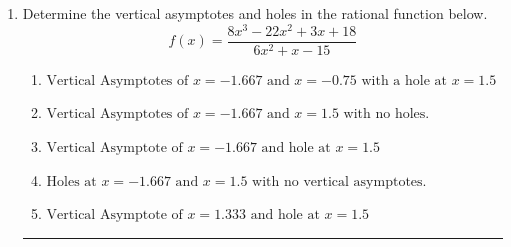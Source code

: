 \documentclass[14pt]{extbook}
\newcommand{\litem}[1]{\item#1\hspace*{-1cm}\rule{\textwidth}{0.4pt}}
\begin{document}
\begin{enumerate}
{\begin{enumerate}[label=\Alph*.]
\end{enumerate} }
\litem{
Determine the vertical asymptotes and holes in the rational function below.\[ f(x) = \frac{8x^{3} -22 x^{2} +3 x + 18}{6x^{2} +x -15} \]\begin{enumerate}[label=\Alph*.]
\item \( \text{Vertical Asymptotes of } x = -1.667 \text{ and } x = -0.75 \text{ with a hole at } x = 1.5 \)
\item \( \text{Vertical Asymptotes of } x = -1.667 \text{ and } x = 1.5 \text{ with no holes.} \)
\item \( \text{Vertical Asymptote of } x = -1.667 \text{ and hole at } x = 1.5 \)
\item \( \text{Holes at } x = -1.667 \text{ and } x = 1.5 \text{ with no vertical asymptotes.} \)
\item \( \text{Vertical Asymptote of } x = 1.333 \text{ and hole at } x = 1.5 \)

\end{enumerate} }
\end{enumerate}
\end{document}
